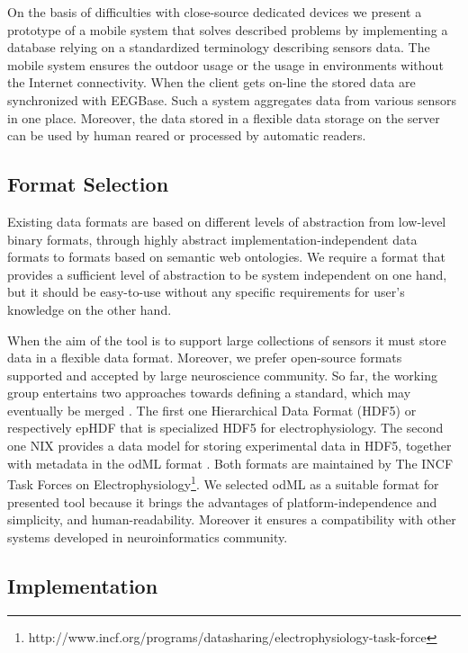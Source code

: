 \documentclass[a4paper,twoside]{article}
\begin{document}
On the basis of difficulties with close-source dedicated devices we present a prototype of a mobile system that solves described problems by implementing a database relying on a standardized terminology describing sensors data. The mobile system ensures the outdoor usage or the usage in environments without the Internet connectivity. When the client gets on-line the stored data are synchronized with EEGBase. Such a system aggregates data from various sensors in one place. Moreover, the data stored in a flexible data storage on the server can be used by human reared or processed by automatic readers.

\subsection{Format Selection}

Existing data formats are based on different levels of abstraction from low-level binary formats, through highly abstract implementation-independent data formats to formats based on semantic web ontologies. We require a format that provides a sufficient level of abstraction to be system independent on one hand, but it should be easy-to-use without any specific requirements for user's knowledge on the other hand.

When the aim of the tool is to support large collections of sensors it must store data in a flexible data format. Moreover, we prefer open-source formats supported and accepted by large neuroscience community. So far, the working group entertains two approaches towards defining a standard, which may eventually be merged \cite{10.3389/conf.fninf.2013.09.00069}. The first one Hierarchical Data Format (HDF5) \cite{hdf5} or respectively epHDF that is specialized HDF5 for electrophysiology. The second one NIX \cite{Stoewer:2014}  provides a data model for storing experimental data in HDF5, together with metadata in the odML format \cite{10.3389/fninf.2011.00016}. Both formats are maintained by The INCF Task Forces on Electrophysiology\footnote{http://www.incf.org/programs/datasharing/electrophysiology-task-force}. We selected odML as a suitable format for presented tool because it brings the advantages of platform-independence and simplicity, and human-readability. Moreover it ensures a compatibility with other systems developed in neuroinformatics community.

\subsection{Implementation}
\end{document}
